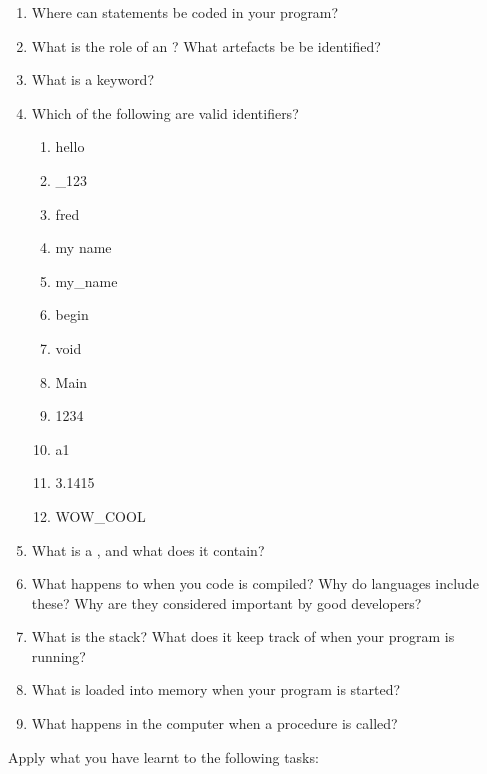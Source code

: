 \begin{enumerate}
  \item Where can statements be coded in your program?
  \item What is the role of an ? What artefacts be be identified?
  \item What is a keyword?
  \item Which of the following are valid identifiers?
  \begin{multicols}{4}
    \ttfamily
    \begin{enumerate}
      \item hello
      \item \_123
      \item fred
      \item my name
      \item my\_name
      \item begin
      \item void
      \item Main
      \item 1234
      \item a1
      \item 3.1415
      \item WOW\_COOL
    \end{enumerate}
  \end{multicols}
  \item What is a , and what does it contain?
  \item What happens to  when you code is compiled? Why do languages include these? Why are they considered important by good developers?
  \item What is the stack? What does it keep track of when your program is running?
  \item What is loaded into memory when your program is started?
  \item What happens in the computer when a procedure is called?
\end{enumerate}

\clearpage
Apply what you have learnt to the following tasks:

